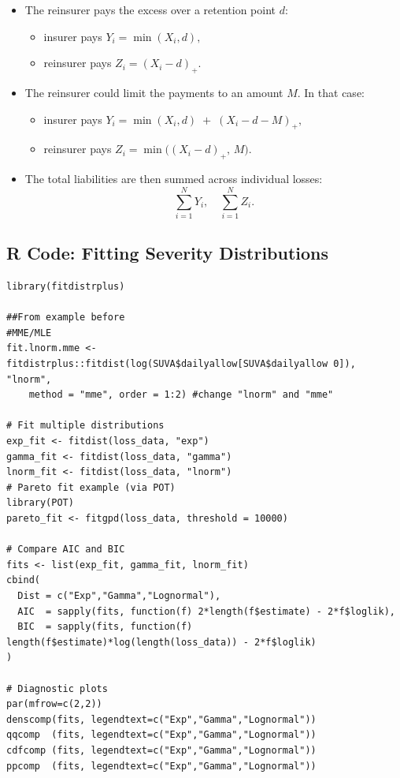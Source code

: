 \documentclass{article}
\begin{document}
\begin{itemize}
  \item The reinsurer pays the excess over a retention point \(d\):
    \begin{itemize}
      \item insurer pays $Y_i = \min(X_i,d),$
      \item reinsurer pays $Z_i = (X_i - d)_+.$
    \end{itemize}
  \item The reinsurer could limit the payments to an amount \(M\). In that case:
    \begin{itemize}
      \item insurer pays $Y_i = \min(X_i,d)\;+\;(X_i - d - M)_+,$
      \item reinsurer pays $Z_i = \min\bigl((X_i - d)_+,\,M\bigr).$
    \end{itemize}
  \item The total liabilities are then summed across individual losses:
    \[
      \sum_{i=1}^{N} Y_i,
      \quad
      \sum_{i=1}^{N} Z_i.
    \]
\end{itemize}

\subsection{R Code: Fitting Severity Distributions}
\begin{lstlisting}
library(fitdistrplus)

##From example before
#MME/MLE
fit.lnorm.mme <- fitdistrplus::fitdist(log(SUVA$dailyallow[SUVA$dailyallow 0]), "lnorm",
    method = "mme", order = 1:2) #change "lnorm" and "mme"

# Fit multiple distributions
exp_fit <- fitdist(loss_data, "exp")
gamma_fit <- fitdist(loss_data, "gamma")
lnorm_fit <- fitdist(loss_data, "lnorm")
# Pareto fit example (via POT)
library(POT)
pareto_fit <- fitgpd(loss_data, threshold = 10000)

# Compare AIC and BIC
fits <- list(exp_fit, gamma_fit, lnorm_fit)
cbind(
  Dist = c("Exp","Gamma","Lognormal"),
  AIC  = sapply(fits, function(f) 2*length(f$estimate) - 2*f$loglik),
  BIC  = sapply(fits, function(f) length(f$estimate)*log(length(loss_data)) - 2*f$loglik)
)

# Diagnostic plots
par(mfrow=c(2,2))
denscomp(fits, legendtext=c("Exp","Gamma","Lognormal"))
qqcomp  (fits, legendtext=c("Exp","Gamma","Lognormal"))
cdfcomp (fits, legendtext=c("Exp","Gamma","Lognormal"))
ppcomp  (fits, legendtext=c("Exp","Gamma","Lognormal"))
\end{lstlisting}
\end{document}
